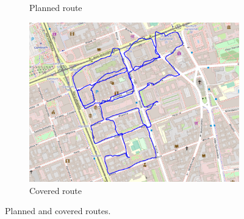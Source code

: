 \documentclass[a4paper,12pt]{article}
\begin{document}
\begin{enumerate}
\begin{figure}[H]
\begin{subfigure}{.80\textwidth}
		\caption{Planned route}
		\label{fig:a6}
	\end{subfigure}%
	\linebreak
	\begin{subfigure}{.80\textwidth}
		\centering
		\includegraphics[width=1\linewidth]{route_c6}
		\caption{Covered route}
		\label{fig:b6}
	\end{subfigure}
	\caption{Planned and covered routes.}
	\label{fig:fig6}
\end{figure} 
\end{enumerate}
\end{document}
